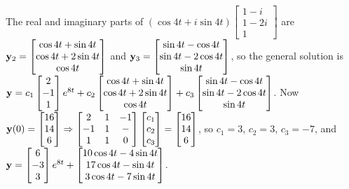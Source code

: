 \documentclass{ximera}
\begin{document}
\begin{problem}
\begin{solution}
The real and imaginary parts of
$(\cos4t+i\sin
4t) \begin{bmatrix}1-i\\1-2i\\1 \end{bmatrix}$
are ${\bf y}_2= \begin{bmatrix}\cos4t+\sin4t
\\\cos4t+2\sin4t\\\cos4t \end{bmatrix}$ and
${\bf y}_3= \begin{bmatrix}\sin4t-\cos4t
\\\sin4t-2\cos4t\\\sin4t \end{bmatrix}$, so the general solution
is ${\bf y}=c_1  \begin{bmatrix}2\\-1\\1 \end{bmatrix}e^{8t}+
c_2 \begin{bmatrix}\cos4t+\sin4t
\\\cos4t+2\sin4t\\\cos4t \end{bmatrix}
+c_3 \begin{bmatrix}\sin4t-\cos4t
\\\sin4t-2\cos4t\\\sin4t \end{bmatrix}$.
Now ${\bf
y}(0)= \begin{bmatrix}16\\14\\6 \end{bmatrix}\Rightarrow \begin{bmatrix}2&1&-1\\-1&1&-\\1&1&0 \end{bmatrix}
 \begin{bmatrix}c_1\\c_2\\c_3 \end{bmatrix}= \begin{bmatrix}16\\14\\6 \end{bmatrix}$, so $c_1=3$, $c_2=3$,
$c_3=-7$, and $ {\bf y}= \begin{bmatrix}6\\-3\\3 \end{bmatrix}e^{8t}
+ \begin{bmatrix}10\cos4t-4\sin4t\\17\cos4t-\sin4t\\3\cos4t-7\sin4t
 \end{bmatrix}$.

\end{solution}
\end{problem}
\end{document}
